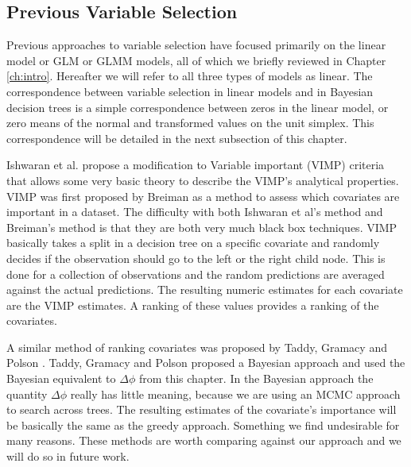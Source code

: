 

\subsection{Previous Variable Selection}
\label{ch:p4sub_var_sel}

Previous approaches to variable selection have focused primarily on the linear model or GLM or GLMM models, all of which we briefly reviewed in Chapter \ref{ch:intro}. Hereafter we will refer to all three types of models as linear. The correspondence between variable selection in linear models and in Bayesian decision trees is a simple correspondence between zeros in the linear model, or zero means of the normal and transformed values on the unit simplex. This correspondence will be detailed in the next subsection of this chapter.   

Ishwaran et al. \cite{ishwaran2010high} propose a modification to Variable important (VIMP) criteria that allows some very basic theory to describe the VIMP's analytical properties. VIMP was first proposed by Breiman \cite{breiman2001random} as a method to assess which covariates are important in a dataset. The difficulty with both Ishwaran et al's method and Breiman's method is that they are both very much black box techniques. VIMP basically takes a split in a decision tree on a specific covariate and randomly decides if the observation should go to the left or the right child node. This is done for a collection of observations and the random predictions are averaged against the actual predictions. The resulting numeric estimates for each covariate are the VIMP estimates. A ranking of these values provides a ranking of the covariates. 

A similar method of ranking covariates was proposed by Taddy, Gramacy and Polson \cite{taddy2011dynamic}. Taddy, Gramacy and Polson proposed a Bayesian approach and used the Bayesian equivalent to $\Delta\phi$ from this chapter. In the Bayesian approach the quantity $\Delta\phi$ really has little meaning, because we are using an MCMC approach to search across trees. The resulting estimates of the covariate's importance will be basically the same as the greedy approach. Something we find undesirable for many reasons. These methods are worth comparing against our approach and we will do so in future work.
 
